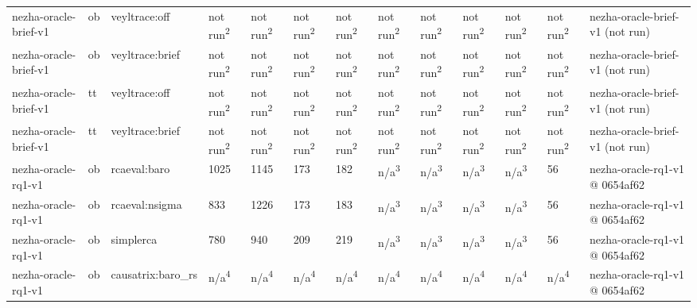 \begin{table}[t]
\begin{tabular}{lllllllllllll}
nezha-oracle-brief-v1 & ob & veyltrace:off & not run\textsuperscript{2} & not run\textsuperscript{2} & not run\textsuperscript{2} & not run\textsuperscript{2} & not run\textsuperscript{2} & not run\textsuperscript{2} & not run\textsuperscript{2} & not run\textsuperscript{2} & not run\textsuperscript{2} & nezha-oracle-brief-v1 (not run) \\
nezha-oracle-brief-v1 & ob & veyltrace:brief & not run\textsuperscript{2} & not run\textsuperscript{2} & not run\textsuperscript{2} & not run\textsuperscript{2} & not run\textsuperscript{2} & not run\textsuperscript{2} & not run\textsuperscript{2} & not run\textsuperscript{2} & not run\textsuperscript{2} & nezha-oracle-brief-v1 (not run) \\
nezha-oracle-brief-v1 & tt & veyltrace:off & not run\textsuperscript{2} & not run\textsuperscript{2} & not run\textsuperscript{2} & not run\textsuperscript{2} & not run\textsuperscript{2} & not run\textsuperscript{2} & not run\textsuperscript{2} & not run\textsuperscript{2} & not run\textsuperscript{2} & nezha-oracle-brief-v1 (not run) \\
nezha-oracle-brief-v1 & tt & veyltrace:brief & not run\textsuperscript{2} & not run\textsuperscript{2} & not run\textsuperscript{2} & not run\textsuperscript{2} & not run\textsuperscript{2} & not run\textsuperscript{2} & not run\textsuperscript{2} & not run\textsuperscript{2} & not run\textsuperscript{2} & nezha-oracle-brief-v1 (not run) \\
nezha-oracle-rq1-v1 & ob & rcaeval:baro & 1025 & 1145 & 173 & 182 & n/a\textsuperscript{3} & n/a\textsuperscript{3} & n/a\textsuperscript{3} & n/a\textsuperscript{3} & 56 & nezha-oracle-rq1-v1 @ 0654af62 \\
nezha-oracle-rq1-v1 & ob & rcaeval:nsigma & 833 & 1226 & 173 & 183 & n/a\textsuperscript{3} & n/a\textsuperscript{3} & n/a\textsuperscript{3} & n/a\textsuperscript{3} & 56 & nezha-oracle-rq1-v1 @ 0654af62 \\
nezha-oracle-rq1-v1 & ob & simplerca & 780 & 940 & 209 & 219 & n/a\textsuperscript{3} & n/a\textsuperscript{3} & n/a\textsuperscript{3} & n/a\textsuperscript{3} & 56 & nezha-oracle-rq1-v1 @ 0654af62 \\
nezha-oracle-rq1-v1 & ob & causatrix:baro\_rs & n/a\textsuperscript{4} & n/a\textsuperscript{4} & n/a\textsuperscript{4} & n/a\textsuperscript{4} & n/a\textsuperscript{4} & n/a\textsuperscript{4} & n/a\textsuperscript{4} & n/a\textsuperscript{4} & n/a\textsuperscript{4} & nezha-oracle-rq1-v1 @ 0654af62 \\

\end{tabular}
\end{table}
